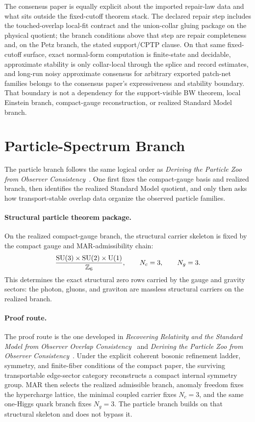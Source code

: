 The consensus paper is equally explicit about the imported repair-law data and what sits
outside the fixed-cutoff theorem stack. The declared repair step includes the
touched-overlap local-fit contract and the union-collar gluing package on the physical quotient;
the branch conditions above that step are repair completeness and, on the Petz branch, the stated
support/CPTP clause. On that same fixed-cutoff surface, exact normal-form computation is
finite-state and decidable, approximate stability is only collar-local through the splice and
record estimates, and long-run noisy approximate consensus for arbitrary exported patch-net
families belongs to the consensus paper's expressiveness and stability boundary. That boundary is
not a dependency for the support-visible BW theorem, local Einstein branch, compact-gauge
reconstruction, or realized Standard Model branch.

\section{Particle-Spectrum Branch}

The particle branch follows the same logical order as
\emph{Deriving the Particle Zoo from Observer Consistency}~\cite{ophparticles}.
One first fixes the compact-gauge basis and realized branch, then identifies the realized
Standard Model quotient, and only then asks how transport-stable overlap data organize the
observed particle families.

\paragraph{Structural particle theorem package.}
On the realized compact-gauge branch, the structural carrier skeleton is fixed by the compact
gauge and MAR-admissibility chain:
\[
\frac{\mathrm{SU}(3)\times\mathrm{SU}(2)\times\mathrm{U}(1)}{\mathbb Z_6},
\qquad
N_c=3,
\qquad
N_g=3.
\]
This determines the exact structural zero rows carried by the gauge and gravity sectors:
the photon, gluons, and graviton are massless structural carriers on the realized branch.

\paragraph{Proof route.}
The proof route is the one developed in
\emph{Recovering Relativity and the Standard Model from Observer Overlap Consistency}~\cite{ophcompact}
and
\emph{Deriving the Particle Zoo from Observer Consistency}~\cite{ophparticles}.
Under the explicit coherent bosonic refinement ladder, symmetry, and finite-fiber conditions of the
compact paper, the surviving transportable edge-sector category reconstructs a compact internal
symmetry group. MAR then selects the realized admissible branch, anomaly freedom
fixes the hypercharge lattice, the minimal coupled carrier fixes \(N_c=3\), and the same
one-Higgs quark branch fixes \(N_g=3\). The particle branch builds on that structural skeleton and does not bypass
it.

